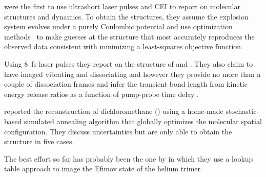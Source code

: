 \citet{Legare05structure,Legare05dynamics} were the first to use ultrashort laser pulses and CEI to report on molecular structures and dynamics. To obtain the structures, they assume the explosion system evolves under a purely Coulombic potential and use optimization methods\footnotemark~ to make guesses at the structure that most accurately reproduces the observed data consistent with minimizing a least-squares objective function.


Using \SI{8}{\fs} laser pulses they report on the structure of  and  \citep{Legare05structure}. They also claim to have imaged vibrating  and dissociating  and  however they provide no more than a couple of dissociation frames and infer the transient  bond length from kinetic energy release ratios as a function of pump-probe time delay \citep{Legare05dynamics}.

\citet{Gagnon08} reported the reconstruction of dichloromethane () using a home-made \footnotemark stochastic-based simulated annealing algorithm that globally optimizes the molecular spatial configuration. They discuss uncertainties but are only able to obtain the structure in five cases.


The best effort so far has probably been the one by \citet{Kunitski15} in which they use a lookup table approach to image the Efimov state of the helium trimer.